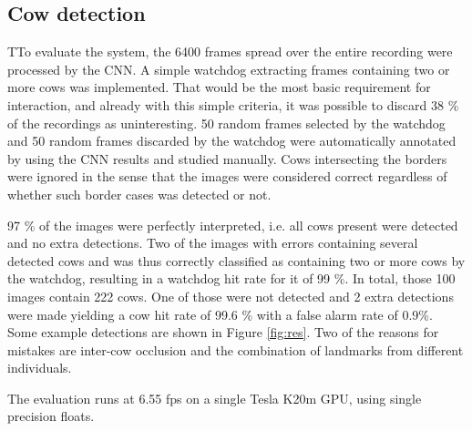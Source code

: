 \documentclass{IET}
\begin{document}
\subsection{Cow detection}
\label{sec:num}
TTo evaluate the system, the 6400 frames spread over the entire recording were processed by the CNN. A simple watchdog extracting frames containing two or more cows was implemented. That would be the most basic requirement for interaction, and already with this simple criteria, it was possible to discard 38 \% of the recordings as uninteresting. 50 random frames selected by the watchdog and 50 random frames discarded by the watchdog were automatically annotated by using the CNN results and studied manually. Cows intersecting the borders were ignored in the sense that the images were considered correct regardless of whether such border cases was detected or not.

97 \% of the images were perfectly interpreted, i.e. all cows present were detected and no extra detections. Two of the images with errors containing several detected cows and was thus correctly classified as containing two or more cows by the watchdog, resulting in a watchdog hit rate for it of 99 \%. In total, those 100 images contain 222 cows. One of those were not detected and 2 extra detections were made yielding a cow hit rate of 99.6 \% with a false alarm rate of 0.9\%. Some example detections are shown in Figure \ref{fig:res}.
Two of the reasons for mistakes are inter-cow occlusion and the combination of landmarks from different individuals.

The evaluation runs at 6.55 fps on a single Tesla K20m GPU, using single precision floats.
\end{document}
